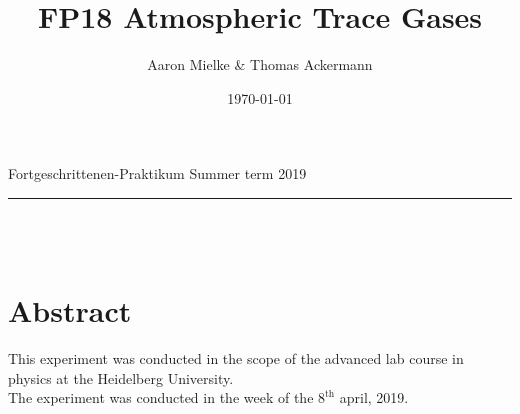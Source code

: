 \documentclass[12pt, a4paper, bibliography=totoc]{scrartcl}
\title{FP18 Atmospheric Trace Gases}
\author{Aaron Mielke \& Thomas Ackermann}
\date{\today}
\begin{document}
\begin{center}
	\makeatletter
	\thispagestyle{empty}
	\large{Fortgeschrittenen-Praktikum}	
	\hfill
    \large{Summer term 2019}
    \vspace{5mm}
	\rule{\textwidth}{0.2pt}
    \vfill
	\Huge\textbf{\@title} \\
	\vspace{10mm}
	\large{\@author} \\
	\normalfont
	\vfill	
	\makeatother
\end{center}

\normalsize
\newpage

\section*{Abstract}

This experiment was conducted in the scope of the advanced lab course in physics at the Heidelberg University. \\
The experiment was conducted in the week of the $8^\text{th}$ april, 2019.

\tableofcontents
\newpage
\end{document}
